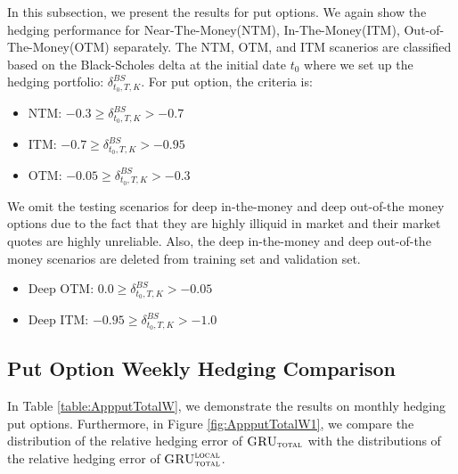 \documentclass[letterpaper,12pt,titlepage,oneside,final]{book}
\numberwithin{equation}{section}
\theoremstyle{definition}
\newcommand{\modelT}{\textsc{GRU}_{\textsc{total}}}
\newcommand{\modelL}{\textsc{GRU}_{\textsc{total}}^{\textsc{local}}}
\begin{document}
In this subsection, we present the results for put options. We again show the hedging performance for Near-The-Money(NTM), In-The-Money(ITM), Out-of-The-Money(OTM) separately.  The NTM, OTM, and ITM scanerios are classified based on the Black-Scholes delta at the initial date $t_0$ where we set up the hedging portfolio: $\delta^{BS}_{t_0,T,K}$. For put option, the criteria is:
\begin{itemize}
	\item  NTM: $-0.3 \geq \delta^{BS}_{t_0,T,K} >-0.7$
	\item ITM: $-0.7 \geq \delta^{BS}_{t_0,T,K} >-0.95$
	\item  OTM: $-0.05 \geq \delta^{BS}_{t_0,T,K} >-0.3$
\end{itemize}
We omit the testing scenarios for deep in-the-money and deep out-of-the money options due to the fact that they are highly illiquid in market and their market quotes are highly unreliable. Also, the deep in-the-money and deep out-of-the money scenarios are deleted from training set and validation set.
\begin{itemize}
	\item  Deep OTM: $0.0 \geq \delta^{BS}_{t_0,T,K} >-0.05$
	\item  Deep ITM: $-0.95 \geq \delta^{BS}_{t_0,T,K} >-1.0$
\end{itemize}
\subsection{Put Option Weekly Hedging Comparison}
In Table \ref{table:AppputTotalW}, we demonstrate the results on monthly hedging put options. Furthermore, in Figure \ref{fig:AppputTotalW1}, we compare the distribution of the relative hedging error of $\modelT$ with the distributions of the relative hedging error of $\modelL$.
\end{document}
